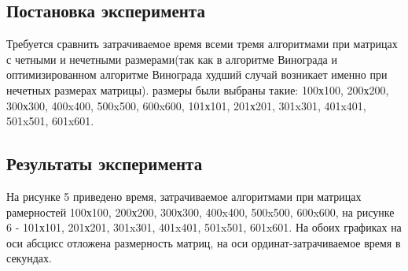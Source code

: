 \documentclass[a4paper, 14pt]{article}
\begin{document}
		\subsection{Постановка эксперимента}
		\parindent=1cm
		Требуется сравнить затрачиваемое время всеми тремя алгоритмами при матрицах с четными и нечетными размерами(так как в алгоритме Винограда и оптимизированном алгоритме Винограда худший случай возникает именно при нечетных размерах матрицы). размеры были выбраны такие: 100х100, 200х200, 300х300, 400x400, 500x500, 600x600, 101х101, 201х201, 301x301, 401x401, 501x501, 601x601.
		\subsection{Результаты эксперимента}
		На рисунке 5 приведено время, затрачиваемое алгоритмами при матрицах рамерностей 100х100, 200х200, 300х300, 400x400, 500x500, 600x600, на рисунке 6 - 101х101, 201х201, 301x301, 401x401, 501x501, 601x601. На обоих графиках на оси абсцисс отложена размерность матриц, на оси ординат-затрачиваемое время в секундах.
\end{document}

